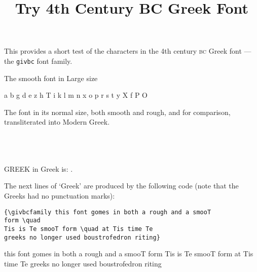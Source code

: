 \documentclass{article}
\title{Try 4th Century BC Greek Font}
\author{}
\date{}
\newcommand{\abc}{a b g d e z h T i k l m n x o p r s t y X f P O}
\newcommand{\Acomms}{\Aalpha%
                     \Abeta%
                     \Agamma%
                     \Adelta%
                     \Aepsilon%
                     \Azeta%
                     \Aeta%
                     \Atheta%
                     \Aiota%
                     \Akappa%
                     \Alambda%
                     \Amu%
                     \Anu%
                     \Axi%
                     \Aomicron%
                     \Api%
                     \Arho%
                     \Asigma%
                     \Atau%
                     \Aupsilon%
                     \Achi%
                     \Aphi%
                     \Apsi%
                     \Aomega}
\newcommand{\ARcomms}{\ARalpha%
                     \ARbeta%
                     \ARgamma%
                     \ARdelta%
                     \ARepsilon%
                     \ARzeta%
                     \AReta%
                     \ARtheta%
                     \ARiota%
                     \ARkappa%
                     \ARlambda%
                     \ARmu%
                     \ARnu%
                     \ARxi%
                     \ARomicron%
                     \ARpi%
                     \ARrho%
                     \ARsigma%
                     \ARtau%
                     \ARupsilon%
                     \ARchi%
                     \ARphi%
                     \ARpsi%
                     \ARomega}
\begin{document}
\maketitle

    This provides a short test of the characters in the 4th century \textsc{bc} Greek 
font
--- the \verb|givbc| font family.

\begin{center}
The smooth font in Large size \\
{\givbcfamily\Large \abc \par
}
\end{center}

\begin{center}
The font in its normal size, both smooth and rough, and for comparison, transliterated into 
Modern Greek. \\
\textgivbc{\Acomms} \\ \textgivbc{\ARcomms} \\
\translitgivbc{\Acomms} \\
\end{center}

    GREEK in Greek is: .

The next lines of `Greek' are produced by the following code (note that
the Greeks had no punctuation marks): 
\begin{verbatim}
{\givbcfamily this font gomes in both a rough and a smooT 
form \quad
Tis is Te smooT form \quad at Tis time Te
greeks no longer used boustrofedron riting}
\end{verbatim}

{\givbcfamily this font gomes in both a rough and a smooT 
form \quad
Tis is Te smooT form \quad at Tis time Te
greeks no longer used boustrofedron riting}
\end{document}
